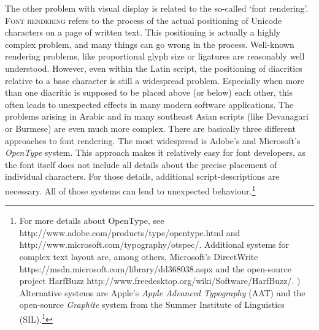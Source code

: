 {{{{{{{{{{{{{{{{{{{{{{{The other problem with visual display is related to the so-called `font rendering'. \textsc{Font rendering }refers to the process of the actual positioning of Unicode characters on a page of written text. This positioning is actually a highly complex problem, and many things can go wrong in the process. Well-known rendering problems, like proportional glyph size or ligatures are reasonably well understood. However, even within the Latin script, the positioning of diacritics relative to a base character is still a widespread problem. Especially when more than one diacritic is supposed to be placed above (or below) each other, this often leads to unexpected effects in many modern software applications. The problems arising in Arabic and in many southeast Asian scripts (like Devanagari or Burmese) are even much more complex. There are basically three different approaches to font rendering. The most widespread is Adobe's and Microsoft's \emph{OpenType }system. This approach makes it relatively easy for font developers, as the font itself does not include all details about the precise placement of individual characters. For those details, additional script-descriptions are necessary. All of those systems can lead to unexpected behaviour.\footnote{For more details about OpenType, see http://www.adobe.com/products/type/opentype.html and http://www.microsoft.com/typography/otspec/. Additional systems for complex text layout are, among others, Microsoft's DirectWrite https://msdn.microsoft.com/library/dd368038.aspx and the open-source project HarfBuzz http://www.freedesktop.org/wiki/Software/HarfBuzz/. ) Alternative systems are Apple's \emph{Apple Advanced Typography} (AAT) and the open-source \emph{Graphite} system from the Summer Institute of Linguistics (SIL).\footnote{More information about AAT can be found at https://developer.apple.com/fonts/. SIL's Graphite is described in detail at http://scripts.sil.org/cms/scripts/page.php?site\_id=projects\&item\_id=graphite\_home. ) In both of these systems, a larger burden is placed on the description inside the font.

\subsection{Pitfall: Homoglyphs}\label{pitfall-homoglyphs}

}}}}}}}}}}}}}}}}}}}}}}}}}
